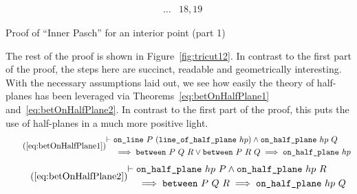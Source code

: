 \begin{boxedfigure}[h]
\begin{align*}
&\ldots & 18,19
\end{align*}
\caption{Proof of ``Inner Pasch'' for an interior point (part 1)}
\label{fig:tricut11}
\end{boxedfigure}

The rest of the proof is shown in Figure~\ref{fig:tricut12}. In contrast to the first part of the proof, the steps here are succinct, readable and geometrically interesting. With the necessary assumptions laid out, we see how easily the theory of half-planes has been leveraged via Theorems~\ref{eq:betOnHalfPlane1} and~\ref{eq:betOnHalfPlane2}. In contrast to the first part of the proof, this puts the use of half-planes in a much more positive light.
\begin{equation*}
\tag{\ref{eq:betOnHalfPlane1}}
  \begin{split}
    \vdash\;&\code{on\_line}\ P\ (\code{line\_of\_half\_plane}\ hp) \wedge \code{on\_half\_plane}\ hp\ Q\\
    &\implies \between{P}{Q}{R} \vee \between{P}{R}{Q} \implies \code{on\_half\_plane}\ hp
  \end{split}
\end{equation*}
\begin{equation*}\tag{\ref{eq:betOnHalfPlane2}}
\begin{split}
    \vdash\;&\code{on\_half\_plane}\ hp\ P \wedge \code{on\_half\_plane}\ hp\ R\\
    &\implies \between{P}{Q}{R} \implies \code{on\_half\_plane}\ hp\ Q
  \end{split}
\end{equation*}

